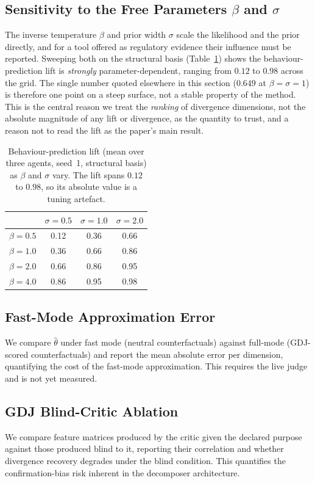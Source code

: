 \subsection{Sensitivity to the Free Parameters $\beta$ and $\sigma$}
\label{subsec:sensitivity}
The inverse temperature $\beta$ and prior width $\sigma$ scale the likelihood and
the prior directly, and for a tool offered as regulatory evidence their influence
must be reported. Sweeping both on the structural basis (Table~\ref{tab:sensitivity})
shows the behaviour-prediction lift is \emph{strongly} parameter-dependent, ranging
from $0.12$ to $0.98$ across the grid. The single number quoted elsewhere in this
section ($0.649$ at $\beta = \sigma = 1$) is therefore one point on a steep surface,
not a stable property of the method. This is the central reason we treat the
\emph{ranking} of divergence dimensions, not the absolute magnitude of any lift or
divergence, as the quantity to trust, and a reason not to read the lift as the
paper's main result.

\begin{table}[h]
\centering
\small
\begin{tabular}{@{}lccc@{}}
\toprule
 & $\sigma = 0.5$ & $\sigma = 1.0$ & $\sigma = 2.0$ \\
\midrule
$\beta = 0.5$ & 0.12 & 0.36 & 0.66 \\
$\beta = 1.0$ & 0.36 & 0.66 & 0.86 \\
$\beta = 2.0$ & 0.66 & 0.86 & 0.95 \\
$\beta = 4.0$ & 0.86 & 0.95 & 0.98 \\
\bottomrule
\end{tabular}
\caption{Behaviour-prediction lift (mean over three agents, seed~1, structural
basis) as $\beta$ and $\sigma$ vary. The lift spans $0.12$ to $0.98$, so its
absolute value is a tuning artefact.}
\label{tab:sensitivity}
\end{table}

\subsection{Fast-Mode Approximation Error}
We compare $\hat{\theta}$ under fast mode (neutral counterfactuals) against
full-mode (GDJ-scored counterfactuals) and report the mean absolute error per
dimension, quantifying the cost of the fast-mode approximation. This requires the
live judge and is not yet measured.

\subsection{GDJ Blind-Critic Ablation}
We compare feature matrices produced by the critic given the declared purpose
against those produced blind to it, reporting their correlation and whether
divergence recovery degrades under the blind condition. This quantifies the
confirmation-bias risk inherent in the decomposer architecture.


